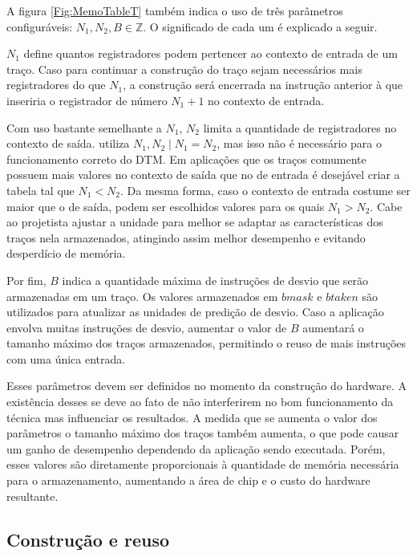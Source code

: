A figura \ref{Fig:MemoTableT} também indica o uso de três parâmetros configuráveis: $N_{1}, N_{2}, B  \in \mathbb{Z}$. O significado de cada um é explicado a seguir.

$N_{1}$ define quantos registradores podem pertencer ao contexto de entrada de um traço. Caso para continuar a construção do traço sejam necessários mais registradores do que $N_{1}$, a construção será encerrada na instrução anterior à que inseriria o registrador de número $N_{1} + 1$ no contexto de entrada.

Com uso bastante semelhante a $N_{1}$, $N_{2}$ limita a quantidade de registradores no contexto de saída.  utiliza $N_{1}, N_{2} \mid N_{1} = N_{2}$, mas isso não é necessário para o funcionamento correto do DTM. Em aplicações que os traços comumente possuem mais valores no contexto de saída que no de entrada é desejável criar a tabela tal que $N_{1} < N_{2}$. Da mesma forma, caso o contexto de entrada costume ser maior que o de saída, podem ser escolhidos valores para os quais $N_{1} > N_{2}$. Cabe ao projetista ajustar a unidade para melhor se adaptar as características dos traços nela armazenados, atingindo assim melhor desempenho e evitando desperdício de memória.

Por fim, $B$ indica a quantidade máxima de instruções de desvio que serão armazenadas em um traço. Os valores armazenados em $bmask$ e $btaken$ são utilizados para atualizar as unidades de predição de desvio. Caso a aplicação envolva muitas instruções de desvio, aumentar o valor de $B$ aumentará o tamanho máximo dos traços armazenados, permitindo o reuso de mais instruções com uma única entrada.

Esses parâmetros devem ser definidos no momento da construção do hardware. A existência desses se deve ao fato de não interferirem no bom funcionamento da técnica mas influenciar os resultados. A medida que se aumenta o valor dos parâmetros o tamanho máximo dos traços também aumenta, o que pode causar um ganho de desempenho dependendo da aplicação sendo executada. Porém, esses valores são diretamente proporcionais à quantidade de memória necessária para o armazenamento, aumentando a área de chip e o custo do hardware resultante.


\subsection{Construção e reuso}
\label{Fundamentacao:DTMHardware:Integracao}

